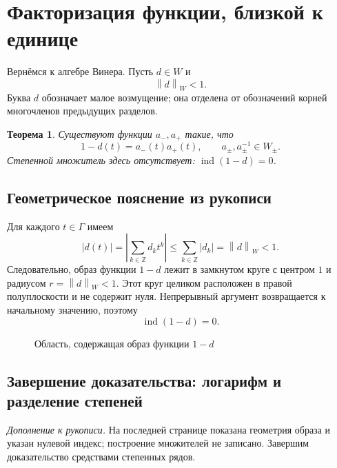 \documentclass[12pt,a4paper]{article}
\newtheorem{theorem}{Теорема}
\theoremstyle{definition}
\theoremstyle{remark}
\newcommand{\ZZ}{\mathbb{Z}}
\newcommand{\norm}[1]{\left\lVert #1\right\rVert}
\DeclareMathOperator{\ind}{ind}
\begin{document}
\section{Факторизация функции, близкой к единице}

Вернёмся к алгебре Винера. Пусть $d\in W$ и
\[
  \norm{d}_W<1.
\]
Буква $d$ обозначает малое возмущение; она отделена от обозначений
корней многочленов предыдущих разделов.

\begin{theorem}
Существуют функции $a_-,a_+$ такие, что
\[
  \boxed{1-d(t)=a_-(t)a_+(t)},\qquad
  a_\pm,a_\pm^{-1}\in W_\pm.
\]
Степенной множитель здесь отсутствует: $\ind(1-d)=0$.
\end{theorem}

\subsection{Геометрическое пояснение из рукописи}

Для каждого $t\in\Gamma$ имеем
\[
  |d(t)|=\left|\sum_{k\in\ZZ}d_kt^k\right|
  \leqslant\sum_{k\in\ZZ}|d_k|=\norm{d}_W<1.
\]
Следовательно, образ функции $1-d$ лежит в замкнутом круге
с центром $1$ и радиусом $r=\norm{d}_W<1$. Этот круг целиком
расположен в правой полуплоскости и не содержит нуля. Непрерывный
аргумент возвращается к начальному значению, поэтому
\[
  \ind(1-d)=0.
\]

\begin{figure}[ht]
  \centering
  \caption{Область, содержащая образ функции $1-d$}
\end{figure}

\subsection{Завершение доказательства: логарифм и разделение степеней}

\emph{Дополнение к рукописи.} На последней странице показана
геометрия образа и указан нулевой индекс; построение множителей
не записано. Завершим доказательство средствами степенных рядов.
\end{document}
